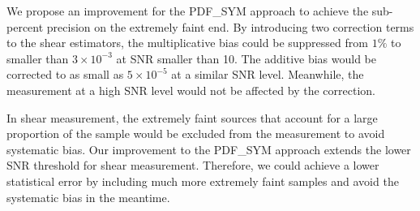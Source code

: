 \documentclass[twocolumn]{aastex62}
\begin{document}
We propose an improvement for the PDF\_SYM approach to achieve the sub-percent precision on the extremely faint end. By introducing two correction terms to the shear estimators, the multiplicative bias could be suppressed from $1\%$ to smaller than $3\times10^{-3}$ at SNR smaller than 10. The additive bias would be corrected to as small as $5\times 10^{-5}$ at a similar SNR level. Meanwhile, the measurement at a high SNR level would not be affected by the correction. 

In shear measurement, the extremely faint sources that account for a large proportion of the sample would be excluded from the measurement to avoid systematic bias. Our improvement to the PDF\_SYM approach extends the lower SNR threshold for shear measurement. Therefore, we could achieve a lower statistical error by including much more extremely faint samples and avoid the systematic bias in the meantime. 
\end{document}
